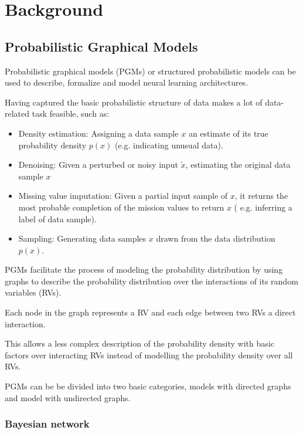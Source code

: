 \chapter{Background}

\section{Probabilistic Graphical Models}

Probabilistic graphical models (PGMs) or structured probabilistic models can be used to describe, formalize and model neural learning architectures.

Having captured the basic probabilistic structure of data makes a lot of data-related task feasible, such as:
\begin{itemize}

\item Density estimation: Assigning a data sample $x$ an estimate of its true probability density $p(x)$ (e.g. indicating unusual data).

\item Denoising: Given a perturbed or noisy input $\widetilde{x}$,  estimating the original data sample $x$

\item Missing value imputation: Given a partial input sample of $x$, it returns the most probable completion of the mission values to return $x$ ( e.g. inferring a label of data sample).

\item Sampling: Generating data samples $x$ drawn from the data distribution $p(x)$. 

\end{itemize}  

PGMs facilitate the process of modeling the probability distribution by using graphs to describe the probability distribution over the interactions of its random variables (RVs).

Each node in the graph represents a RV and each edge between two RVs a direct interaction.

This allows a less complex description of the probability density with basic factors over interacting RVs instead of modelling the probability density over all RVs. 

PGMs can be be divided into two basic categories, models with directed graphs and model with undirected graphs.


\subsection{Bayesian network}

